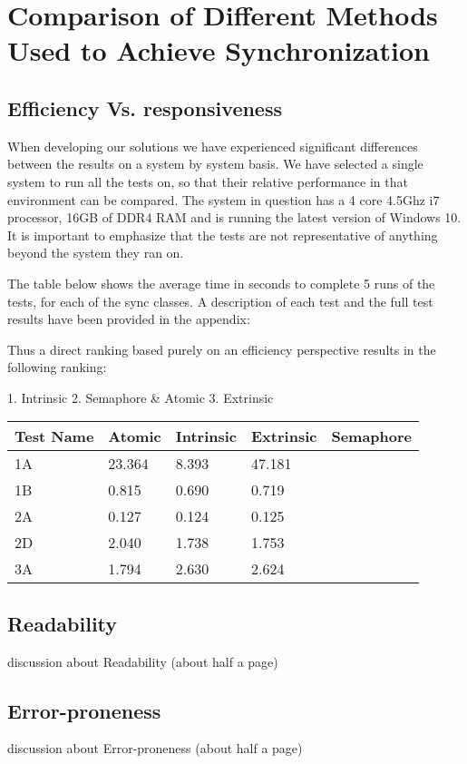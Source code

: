 \documentclass[11pt]{article}
\begin{document}
\maketitle
\tableofcontents
\thispagestyle{empty}
\pagebreak
\setcounter{page}{1}
\section{Comparison of Different Methods Used to Achieve Synchronization}

\subsection{Efficiency Vs. responsiveness}


When developing our solutions we have experienced significant differences between the results on a system by system basis. We have selected a single system to run all the tests on, so that their relative performance in that environment can be compared. The system in question has a 4 core 4.5Ghz i7 processor, 16GB of DDR4 RAM and is running the latest version of Windows 10. It is important to emphasize that the tests are not representative of anything beyond the system they ran on.

The table below shows the average time in seconds to complete 5 runs of the tests, for each of the sync classes. A description of each test and the full test results have been provided in the appendix: 

Thus a direct ranking based purely on an efficiency perspective results in the following ranking: 

1. Intrinsic 
2. Semaphore & Atomic 
3. Extrinsic


\begin{table}[]
\begin{tabular}{|l|l|l|l|l|}
\hline
Test Name & Atomic & Intrinsic & Extrinsic & Semaphore \\ \hline
1A        & 23.364 & 8.393     & 47.181    &           \\ \hline
1B        & 0.815  & 0.690     & 0.719     &           \\ \hline
2A        & 0.127  & 0.124     & 0.125     &           \\ \hline
2D        & 2.040  & 1.738     & 1.753     &           \\ \hline
3A        & 1.794  & 2.630     & 2.624     &           \\ \hline
\end{tabular}
\end{table}

\subsection{Readability}
discussion about  Readability (about half a page)
\subsection{Error-proneness}
discussion about Error-proneness (about half a page)




\end{document}
